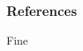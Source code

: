\documentclass{beamer}
\begin{document}


\begin{frame}[allowframebreaks]
\frametitle{References}
\tiny{
			
			
		}
\end{frame}


\begin{frame}
\Huge{\centerline{Fine}}
\end{frame}

\end{document}
